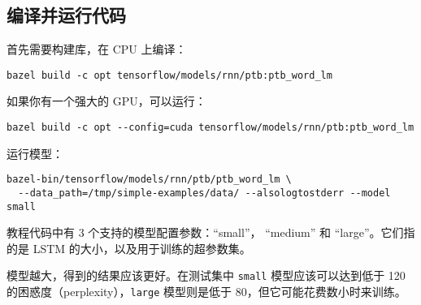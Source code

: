 \begin{Shaded}
\begin{Highlighting}[]
\OperatorTok{=} 
\OperatorTok{=} \OperatorTok{*} 

\OperatorTok{=} \OperatorTok{=} 
  \NormalTok{(}
    \OperatorTok{=} 


\OperatorTok{=} 
\end{Highlighting}
\end{Shaded}

\subsection{编译并运行代码
}\label{ux7f16ux8bd1ux5e76ux8fd0ux884cux4ee3ux7801}

首先需要构建库，在 CPU 上编译：

\begin{verbatim}
bazel build -c opt tensorflow/models/rnn/ptb:ptb_word_lm
\end{verbatim}

如果你有一个强大的 GPU，可以运行：

\begin{verbatim}
bazel build -c opt --config=cuda tensorflow/models/rnn/ptb:ptb_word_lm
\end{verbatim}

运行模型：

\begin{verbatim}
bazel-bin/tensorflow/models/rnn/ptb/ptb_word_lm \
  --data_path=/tmp/simple-examples/data/ --alsologtostderr --model small
\end{verbatim}

教程代码中有 3 个支持的模型配置参数：``small''， ``medium'' 和
``large''。它们指的是 LSTM 的大小，以及用于训练的超参数集。

模型越大，得到的结果应该更好。在测试集中 \lstinline{small}
模型应该可以达到低于 120 的困惑度（perplexity），\lstinline{large}
模型则是低于 80，但它可能花费数小时来训练。

